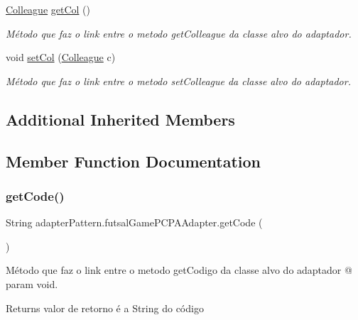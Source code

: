 \begin{DoxyCompactItemize}
\mbox{\hyperlink{classmediator_pattern_1_1_colleague}{Colleague}} \mbox{\hyperlink{classadapter_pattern_1_1futsal_game_p_c_p_a_adapter_a8b104bff8d91fbd51df1a498a38a67f3}{get\+Col}} ()
\begin{DoxyCompactList}\small\item\em Método que faz o link entre o metodo get\+Colleague da classe alvo do adaptador. \end{DoxyCompactList}\item 
void \mbox{\hyperlink{classadapter_pattern_1_1futsal_game_p_c_p_a_adapter_a6349af17da6ad49b3bd5cd23db7e6e54}{set\+Col}} (\mbox{\hyperlink{classmediator_pattern_1_1_colleague}{Colleague}} c)
\begin{DoxyCompactList}\small\item\em Método que faz o link entre o metodo set\+Colleague da classe alvo do adaptador. \end{DoxyCompactList}\end{DoxyCompactItemize}
\subsection*{Additional Inherited Members}


\subsection{Member Function Documentation}
\mbox{\label{classadapter_pattern_1_1futsal_game_p_c_p_a_adapter_a1a5a0c5d5893c6de4991355684e0452f}} 
\subsubsection{\texorpdfstring{getCode()}{getCode()}}
{\footnotesize\ttfamily String adapter\+Pattern.\+futsal\+Game\+P\+C\+P\+A\+Adapter.\+get\+Code (\begin{DoxyParamCaption}{ }\end{DoxyParamCaption})}



Método que faz o link entre o metodo get\+Codigo da classe alvo do adaptador @ param void. 

\begin{DoxyReturn}{Returns}
valor de retorno é a String do código 
\end{DoxyReturn}


